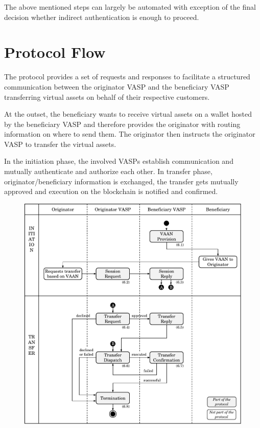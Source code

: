 \documentclass{article}
\begin{document}
The above mentioned steps can largely be automated with exception of the final decision whether indirect authentication is enough to proceed.
\newpage


\section{Protocol Flow}

The protocol provides a set of requests and responses to facilitate a structured communication between the originator VASP and the beneficiary VASP transferring virtual assets on behalf of their respective customers.

At the outset, the beneficiary wants to receive virtual assets on a wallet hosted by the beneficiary VASP and therefore provides the originator with routing information on where to send them. The originator then instructs the originator VASP to transfer the virtual assets.

In the initiation phase, the involved VASPs establish communication and mutually authenticate and authorize each other. In transfer phase, originator/beneficiary information is exchanged, the transfer gets mutually approved and execution on the blockchain is notified and confirmed.

\begin{figure}[h]
    \centering
    \includegraphics[width=\textwidth]{g7.pdf}
\end{figure}
\newpage
\end{document}
